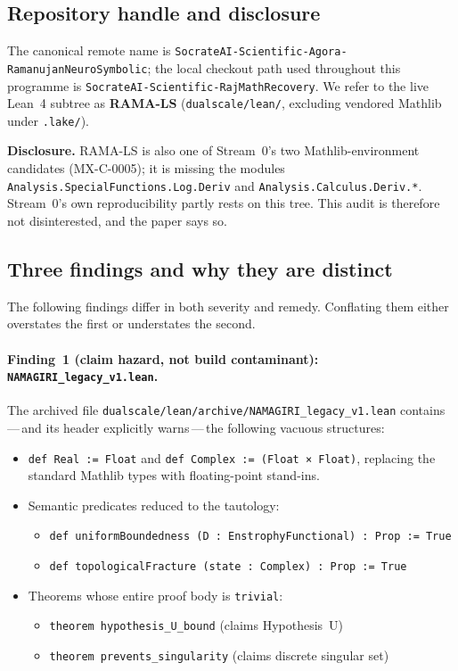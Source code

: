 \documentclass[11pt,a4paper]{article}
\theoremstyle{plain}
\theoremstyle{definition}
\theoremstyle{remark}
\begin{document}
\subsection*{Repository handle and disclosure}

The canonical remote name is
\texttt{SocrateAI-Scientific-Agora-Ra\-ma\-nu\-jan\-Neuro\-Symbolic};
the local checkout path used throughout this programme is
\texttt{SocrateAI-Scientific-RajMathRecovery}.
We refer to the live Lean~4 subtree as \textbf{RAMA-LS}
(\texttt{dualscale/lean/}, excluding vendored Mathlib under \texttt{.lake/}).

\noindent
\textbf{Disclosure.}
RAMA-LS is also one of Stream~0's two Mathlib-environment candidates
(MX-C-0005); it is missing the modules
\texttt{Analysis.SpecialFunctions.Log.Deriv} and
\texttt{Analysis.Calculus.Deriv.*}.
Stream~0's own reproducibility partly rests on this tree.
This audit is therefore not disinterested, and the paper says so.

\subsection*{Three findings and why they are distinct}

The following findings differ in both severity and remedy.
Conflating them either overstates the first or understates the second.

\paragraph{Finding~1 (claim hazard, not build contaminant):
\texttt{NAMAGIRI\_legacy\_v1.lean}.}

The archived file
\texttt{dualscale/lean/archive/NAMAGIRI\_legacy\_v1.lean}
contains\,---\,and its header explicitly warns\,---\,the following vacuous
structures:

\begin{itemize}
  \item \verb|def Real := Float| and \verb|def Complex := (Float × Float)|,
    replacing the standard Mathlib types with floating-point stand-ins.
  \item Semantic predicates reduced to the tautology:
    \begin{itemize}
      \item \verb|def uniformBoundedness (D : EnstrophyFunctional) : Prop := True|
      \item \verb|def topologicalFracture (state : Complex) : Prop := True|
    \end{itemize}
  \item Theorems whose entire proof body is \verb|trivial|:
    \begin{itemize}
      \item \verb|theorem hypothesis_U_bound| (claims Hypothesis~U)
      \item \verb|theorem prevents_singularity| (claims discrete singular set)
    \end{itemize}
\end{itemize}
\end{document}
